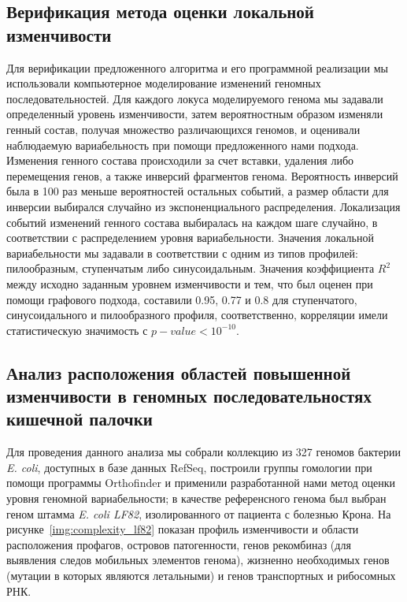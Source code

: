 \subsection*{Верификация метода оценки локальной изменчивости}
Для верификации предложенного алгоритма и его программной реализации мы использовали компьютерное моделирование изменений геномных последовательностей. Для каждого локуса моделируемого генома мы задавали определенный уровень изменчивости, затем вероятностным образом изменяли генный состав, получая множество различающихся геномов, и оценивали наблюдаемую вариабельность при помощи предложенного нами подхода. Изменения генного состава происходили за счет вставки, удаления либо перемещения генов, а также инверсий фрагментов генома. Вероятность инверсий была в 100 раз меньше вероятностей остальных событий, а размер области для инверсии выбирался случайно из экспоненциального распределения. Локализация событий изменений генного состава выбиралась на каждом шаге случайно, в соответствии с распределением уровня вариабельности. Значения локальной вариабельности мы задавали в соответствии с одним из типов профилей: пилообразным, ступенчатым либо синусоидальным. Значения коэффициента $R^2$ между исходно заданным уровнем изменчивости и тем, что был оценен при помощи графового подхода, составили 0.95, 0.77 и 0.8 для ступенчатого, синусоидального и пилообразного профиля, соответственно, корреляции имели статистическую значимость с ${p-value < 10^{-10} }$.

\subsection*{Анализ расположения областей повышенной изменчивости в геномных последовательностях кишечной палочки}
Для проведения данного анализа мы собрали коллекцию из 327 геномов бактерии \textit{E. coli}, доступных в базе данных RefSeq, построили группы гомологии при помощи программы Orthofinder и применили разработанной нами метод оценки уровня геномной вариабельности; в качестве референсного генома был выбран геном штамма \textit{E. coli LF82}, изолированного от пациента с болезнью Крона. На рисунке~\ref{img:complexity_lf82} показан профиль изменчивости и области расположения профагов, островов патогенности, генов рекомбиназ (для выявления следов мобильных элементов генома), жизненно необходимых генов (мутации в которых являются летальными) и генов транспортных и рибосомных РНК.

